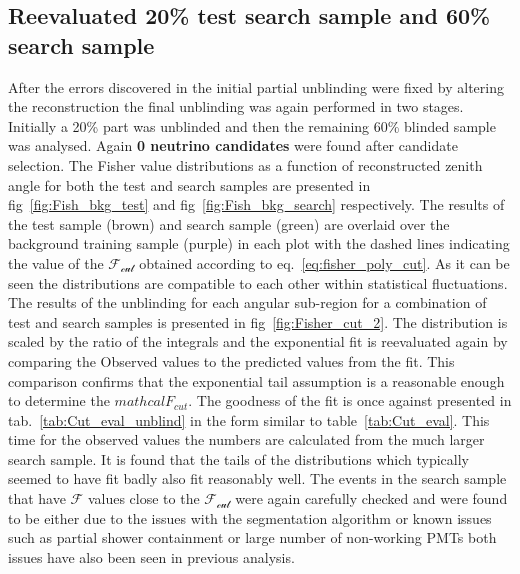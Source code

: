 \subsection{Reevaluated 20\% test search sample and 60\% search sample}
\label{subsec:unblind_60}
After the errors discovered in the initial partial unblinding were fixed by altering the reconstruction the final unblinding was again performed in two stages. Initially a 20\% part was unblinded and then the remaining 60\% blinded sample was analysed. Again \textbf{0 neutrino candidates} were found after candidate selection. The Fisher value distributions as a function of reconstructed zenith angle for both the test and search samples are presented in fig~\ref{fig:Fish_bkg_test} and fig~\ref{fig:Fish_bkg_search} respectively. The results of the test sample (brown) and search sample (green) are overlaid over the background training sample (purple) in each plot with the dashed lines indicating the value of the $\mathcal{F_{cut}}$ obtained according to eq.~\ref{eq:fisher_poly_cut}. As it can be seen the distributions are compatible to each other within statistical fluctuations. The results of the unblinding for each angular sub-region for a combination of test and search samples is presented in fig~\ref{fig:Fisher_cut_2}. The distribution is scaled by the ratio of the integrals and the exponential fit is reevaluated again by comparing the Observed values to the predicted values from the fit. This comparison confirms that the exponential tail assumption is a reasonable enough to determine the $mathcal{F_{cut}}$. The goodness of the fit is once against presented in tab.~\ref{tab:Cut_eval_unblind} in the form similar to table~\ref{tab:Cut_eval}. This time for the observed values the numbers are calculated from the much larger search sample. It is found that the tails of the distributions which typically seemed to have fit badly also fit reasonably well. The events in the search sample that have $\mathcal{F}$ values close to the $\mathcal{F_{cut}}$ were again carefully checked and were found to be either due to the issues with the segmentation algorithm or known issues such as partial shower containment or large number of non-working PMTs both issues have also been seen in previous analysis. 

